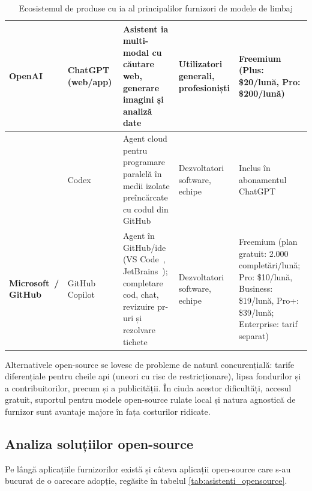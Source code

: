 \documentclass[12pt, a4paper, oneside, romanian]{teza-upb}
\begin{document}
\begin{table}[H]
\begin{tabularx}{\textwidth}{|>{\hsize=0.55\hsize\RaggedRight}X|>{\hsize=0.55\hsize\RaggedRight}X|>{\hsize=1.3\hsize\RaggedRight}X|>{\hsize=0.4\hsize\RaggedRight}X|>{\hsize=1.2\hsize\RaggedRight}X|}
      \textbf{OpenAI~\cite{web_openai}} & ChatGPT~\cite{web_chatgpt} (web/app) & Asistent \ac{ia} multi-modal cu căutare web, generare imagini și analiză date & Utilizatori generali, profesioniști & Freemium (Plus: \$20/lună, Pro: \$200/lună) \\
      \hline
      & Codex~\cite{gh_codex} & Agent cloud pentru programare paralelă în medii izolate preîncărcate cu codul din GitHub~\cite{web_github} & Dezvoltatori software, echipe & Inclus în abonamentul ChatGPT \\
      \hline

      \textbf{Microsoft~\cite{web_microsoft}/ GitHub} & GitHub Copilot~\cite{web_gh_copilot} & Agent în GitHub/\ac{ide} (VS Code~\cite{web_vscode}, JetBrains~\cite{web_jetbrains}); completare cod, chat, revizuire \ac{pr}-uri și rezolvare tichete & Dezvoltatori software, echipe & Freemium (plan gratuit: 2.000 completări/lună; Pro: \$10/lună, Business: \$19/lună, Pro+: \$39/lună; Enterprise: tarif separat) \\
      \hline

    \end{tabularx}
  \caption{Ecosistemul de produse cu \ac{ia} al principalilor furnizori de modele de limbaj}
  \label{tab:produse_ai}
  \end{table}

  Alternativele open-source se lovesc de probleme de natură concurențială: tarife diferențiale pentru cheile \ac{api} (uneori cu risc de restricționare), lipsa fondurilor și a contribuitorilor, precum și a publicității. În ciuda acestor dificultăți, accesul gratuit, suportul pentru modele open-source rulate local și natura agnostică de furnizor sunt avantaje majore în fața costurilor ridicate.

  \subsection{Analiza soluțiilor open-source}

  Pe lângă aplicațiile furnizorilor există și câteva aplicații open-source care s-au bucurat de o oarecare adopție, regăsite în tabelul \ref{tab:asistenti_opensource}.
\end{document}

